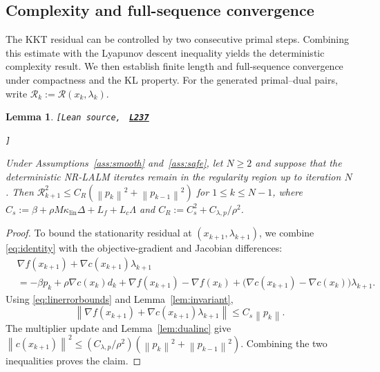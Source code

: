\documentclass[11pt]{article}
\newtheorem{lemma}[theorem]{Lemma}
\theoremstyle{definition}
\theoremstyle{remark}
\numberwithin{equation}{section}
\numberwithin{figure}{section}
\numberwithin{table}{section}
\numberwithin{algorithm}{section}
\newcommand{\norm}[1]{\left\lVert #1\right\rVert}
\newcommand{\grad}{\nabla}
\newcommand{\leanLinkText}[1]{%
  \underline{\textbf{#1}}%
}
\newcommand{\leanDeclTag}[2]{%
  {\footnotesize\texttt{[Lean source, }}%
  \href{https://github.com/optpku/ReasBook/blob/v4.32.2/ReasBook/Papers/TR_LALM_theory/#1?plain=1\#L#2}%
    {\leanLinkText{\footnotesize\texttt{L#2}}}%
}
\newcommand{\leanDeclTagEnd}{%
  \unskip
  {\footnotesize\texttt{]}}\enspace
}
\begin{document}
\subsection{Complexity and full-sequence convergence}

The KKT residual can be controlled by two consecutive primal steps.
Combining this estimate with the Lyapunov descent inequality yields the deterministic complexity result.  We then establish finite length and full-sequence convergence under compactness and the KL property.  For the generated primal--dual pairs, write
$\mathcal R_k:=\mathcal R(x_k,\lambda_k)$.

\begin{lemma}
\label{lem:kktres}
\leanDeclTag{Lemma_2_11.lean}{237}
\leanDeclTagEnd
Under Assumptions~\ref{ass:smooth} and~\ref{ass:safe}, let $N\ge2$ and suppose that the deterministic NR-LALM iterates remain in the regularity region up to iteration $N$. Then
\(\mathcal R_{k+1}^2
\le C_R(\norm{p_k}^2+\norm{p_{k-1}}^2)\) for \(1\le k\le N-1\),
where \(C_s:=\beta+\rho M\kappa_{\mathrm{lin}}\Delta+L_f+L_c\Lambda\)
and \(C_R:=C_s^2+C_{\lambda,p}/\rho^2\).
\end{lemma}

\begin{proof}
To bound the stationarity residual at $(x_{k+1},\lambda_{k+1})$, we combine \eqref{eq:identity} with the objective-gradient and Jacobian differences:
\begin{align*}
&\grad f(x_{k+1})+\grad c(x_{k+1})\lambda_{k+1}\\
&=-\beta p_k+\rho\grad c(x_k)d_k
  +\grad f(x_{k+1})-\grad f(x_k)
  +\big(\grad c(x_{k+1})-\grad c(x_k)\big)\lambda_{k+1}.
\end{align*}
Using \eqref{eq:linerrorbounds} and Lemma~\ref{lem:invariant},
\begin{equation}
\norm{\grad f(x_{k+1})
      +\grad c(x_{k+1})\lambda_{k+1}}
\le C_s\norm{p_k}.
\label{eq:statbound}
\end{equation}
The multiplier update and Lemma~\ref{lem:dualinc} give
\(\norm{c(x_{k+1})}^2
\le(C_{\lambda,p}/\rho^2)(\norm{p_k}^2+\norm{p_{k-1}}^2)\).
Combining the two inequalities proves the claim.
\end{proof}
\end{document}
